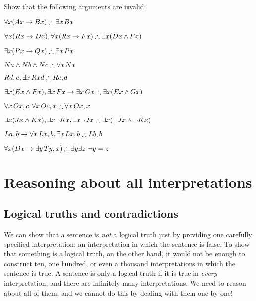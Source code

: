 \begin{practiceproblems}
\problempart
Show that the following arguments are invalid:
\begin{earg}
\item $\forall x(\atom{A}{x} \eif \atom{B}{x}) \therefore \exists x\,\atom{B}{x}$
\item $\forall x(\atom{R}{x} \eif \atom{D}{x}), \forall x(\atom{R}{x} \eif \atom{F}{x}) \therefore \exists x(\atom{D}{x} \eand \atom{F}{x})$
\item $\exists x(\atom{P}{x}\eif \atom{Q}{x}) \therefore \exists x\,\atom{P}{x}$
\item $\atom{N}{a} \eand \atom{N}{b} \eand \atom{N}{c} \therefore \forall x\,\atom{N}{x}$
\item $\atom{R}{d,e}, \exists x\,\atom{R}{xd} \therefore \atom{R}{e,d}$
\item $\exists x(\atom{E}{x} \eand \atom{F}{x}), \exists x\,\atom{F}{x} \eif \exists x\,\atom{G}{x} \therefore \exists x(\atom{E}{x} \eand \atom{G}{x})$
\item $\forall x\,\atom{O}{x,c}, \forall x\,\atom{O}{c,x} \therefore \forall x\,\atom{O}{x,x}$
\item $\exists x(\atom{J}{x} \eand \atom{K}{x}), \exists x \enot \atom{K}{x}, \exists x \enot \atom{J}{x} \therefore \exists x(\enot \atom{J}{x} \eand \enot \atom{K}{x})$
\item $\atom{L}{a,b} \eif \forall x\,\atom{L}{x,b}, \exists x\,\atom{L}{x,b} \therefore \atom{L}{b,b}$
\item $\forall x(\atom{D}{x} \eif \exists y\,\atom{T}{y,x}) \therefore \exists y \exists z\ \enot y= z$
\end{earg}


\end{practiceproblems}


\chapter{Reasoning about all interpretations}

\section{Logical truths and contradictions}
We can show that a sentence is \emph{not} a logical truth just by providing one carefully specified interpretation: an interpretation in which the sentence is false. To show that something is a logical truth, on the other hand, it would not be enough to construct ten, one hundred, or even a thousand interpretations in which the sentence is true. A sentence is only a logical truth if it is true in \emph{every} interpretation, and there are infinitely many interpretations. We need to reason about all of them, and we cannot do this by dealing with them one by one!

